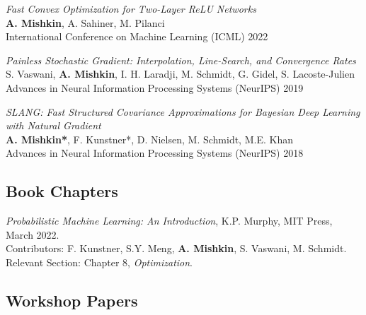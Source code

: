 \documentclass[11pt, a4paper]{article}
\makeatletter
\gdef\tshortstack{\@ifnextchar[\@tshortstack{\@tshortstack[c]}}
\gdef\@tshortstack[#1]{%
  \leavevmode
  \vtop\bgroup
    \baselineskip-\p@\lineskip 3\p@
    \let\mb@l\hss\let\mb@r\hss
    \expandafter\let\csname mb@#1\endcsname\relax
    \let\\\@stackcr
    \@ishortstack}
\newcommand{\mitem}[1]{\item[\smash{\tshortstack[l]{#1}}]}
\newcommand{\mleftsize}{4.75em}
\makeatother
\begin{document}
\begin{description}[leftmargin=\mleftsize,style=nextline,font=\normalfont\space]
    \mitem{2022\\[.25em] ICML}
    \textit{Fast Convex Optimization for Two-Layer ReLU Networks}\\
    {\bf A. Mishkin}, A. Sahiner, M. Pilanci\\
    International Conference on Machine Learning (ICML) 2022

    \mitem{2019\\[.25em] NeurIPS}
    \textit{Painless Stochastic Gradient: Interpolation, Line-Search, and Convergence Rates}\\
    S. Vaswani, {\bf A. Mishkin}, I. H. Laradji, M. Schmidt, G. Gidel, S. Lacoste-Julien\\
    Advances in Neural Information Processing Systems (NeurIPS) 2019

    \mitem{2018\\[.25em] NeurIPS}
    \textit{SLANG: Fast Structured Covariance Approximations for Bayesian Deep Learning with Natural Gradient}\\
    {\bf A. Mishkin*}, F. Kunstner*, D. Nielsen, M. Schmidt, M.E. Khan\\
    Advances in Neural Information Processing Systems (NeurIPS) 2018
\end{description}

\subsection{Book Chapters}

\begin{description}[leftmargin=\mleftsize,style=nextline,font=\normalfont\space]
    \mitem{2022\\[.25em]}
    \textit{Probabilistic Machine Learning: An Introduction}, K.P. Murphy, MIT Press, March 2022.\\
    Contributors: F. Kunstner, S.Y. Meng, \textbf{A. Mishkin}, S. Vaswani, M. Schmidt.\\
    Relevant Section: Chapter 8, \textit{Optimization}.
\end{description}

\subsection{Workshop Papers}
\end{document}

